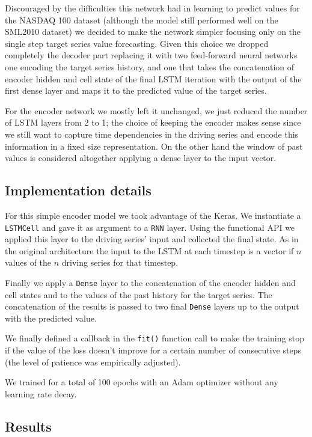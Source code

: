 \documentclass{article}
\begin{document}
Discouraged by the difficulties this network had in learning to predict values 
for the NASDAQ 100 dataset (although the model still performed well on the 
SML2010 dataset) we decided to make the network simpler focusing only on the 
single step target series value forecasting. Given this choice we dropped 
completely the decoder part replacing it with two feed-forward neural networks 
one encoding the target series history, and one that takes the concatenation of 
encoder hidden and cell state of the final LSTM iteration with the output of the 
first dense layer and maps it to the predicted value of the target series.

For the encoder network we mostly left it unchanged, we 
just reduced the number of LSTM layers from 2 to 1; the choice of keeping the 
encoder makes sense since we still want to capture time dependencies in the 
driving series and encode this information in a fixed size representation. On the 
other hand the window of past values is considered altogether applying a dense 
layer to the input vector.


\subsection{Implementation details}

For this simple encoder model we took advantage of the Keras. We instantiate a
\texttt{LSTMCell} and gave it as argument to a \texttt{RNN} layer. Using the
functional API we applied this layer to the driving series' input and collected
the final state. As in the original architecture the input to the LSTM at each 
timestep is a vector if $n$ values of the $n$ driving series for that timestep.

Finally we apply a \texttt{Dense} layer to the concatenation of the encoder 
hidden and cell states and to the values of the past history for the target 
series. The concatenation of the results is passed to two final \texttt{Dense} 
layers up to the output with the predicted value.

We finally defined a callback in the \texttt{fit()} function call to make the
training stop if the value of the loss doesn't improve for a certain number of
consecutive steps (the level of patience was empirically adjusted).

We trained for a total of 100 epochs with an Adam optimizer without any learning 
rate decay.

\subsection{Results}
\end{document}

